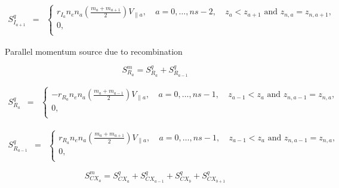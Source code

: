 \documentclass[a4paper,10pt]{report}
\begin{document}
\begin{equation}
\begin{matrix}
S_{I_{a+1}}^q & =
& \left\{
\begin{matrix}
r_{I_a} n_e n_a \left( \frac{m_a+m_{a+1}}2 \right) V_{\parallel a}, & \ a=0,\ldots,ns-2, & \ z_a < z_{a+1} \text{ and } z_{n,a} = z_{n,a+1}, \\
0, \\
\end{matrix} \right.
\end{matrix}
\end{equation}

Parallel momentum source due to recombination

\begin{equation*}
S_{R_a}^m = S_{R_a}^q + S_{R_{a-1}}^q
\end{equation*}

\begin{equation}
\begin{matrix}
S_{R_a}^q & =
& \left\{
\begin{matrix}
-r_{R_a} n_e n_a \left( \frac{m_a+m_{a-1}}2 \right) V_{\parallel a}, & \ a=0,\ldots,ns-1, & \ z_{a-1} < z_a \text{ and } z_{n,a-1}= z_{n,a}, \\
0, \\
\end{matrix} \right.
\end{matrix}
\end{equation}

\begin{equation}
\begin{matrix}
S_{R_{a-1}}^q & =
& \left\{
\begin{matrix}
r_{R_a} n_e n_a \left( \frac{m_a+m_{a+1}}2 \right) V_{\parallel a}, & \ a=0,\ldots,ns-1, & \ z_{a-1} < z_a \text{ and } z_{n,a-1}= z_{n,a}, \\
0, \\
\end{matrix} \right.
\end{matrix}
\end{equation}


\begin{equation*}
S_{CX_a}^m= S_{CX_a}^q + S_{CX_{a-1}}^q + S_{CX_b}^q + S_{CX_{b+1}}^q
\end{equation*}
\end{document}
